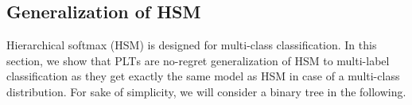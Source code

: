 \documentclass{article}
\newcommand{\Algo}[1]{\textsc{#1}}
\newcommand{\sectionBefore}{-0pt}
\newcommand{\sectionAfter}{-0pt}
\begin{document}
{\vspace{\sectionBefore}
\subsection{Generalization of HSM}
\label{sec:online_PLTs}
\vspace{\sectionAfter}

Hierarchical softmax (\Algo{HSM}) is designed for multi-class classification. In this section, we show that \Algo{PLT}s are no-regret generalization of \Algo{HSM} to multi-label classification as they get exactly the same model as \Algo{HSM} in case of a multi-class distribution. 
For sake of simplicity, we will consider a binary tree in the following.  

}
\end{document}
